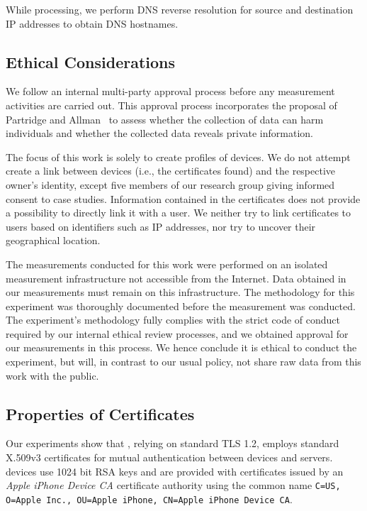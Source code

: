 {\noindent}While processing, we perform DNS reverse resolution for source and destination IP addresses to obtain DNS hostnames.

\subsection{Ethical Considerations}\label{sec:ethical}

We follow an internal multi-party approval process before any measurement
activities are carried out. This approval process incorporates the proposal of
Partridge and Allman~\cite{partridge2016ethical} to assess whether the
collection of data can harm individuals and whether the collected data
reveals private information.

The focus of this work is solely to create profiles of devices. We do not
attempt create a link between devices (i.e., the certificates found) and the
respective owner's identity, except five members of our research group giving informed consent to case studies.
Information contained in the certificates does not provide a possibility to directly link it with a user. 
We neither try to link certificates to users based on identifiers such as IP addresses, nor try to uncover their geographical location.

The measurements conducted for this work were performed on an isolated measurement infrastructure not accessible from the Internet. 
Data obtained in our measurements must remain on this infrastructure. 
%
The methodology for this experiment was thoroughly documented before the measurement was conducted.
The experiment's methodology fully complies with the strict code of conduct required by our internal ethical review processes, and we obtained approval for our measurements in this process. 
We hence conclude it is ethical to conduct the experiment, but will, in contrast to our usual policy, not share raw data from this work with the public.


\subsection{Properties of {\apns} Certificates}
Our experiments show that \apns, relying on standard TLS 1.2, employs
standard X.509v3 certificates for mutual authentication between devices and
{\apns} servers. {\apns} devices use 1024 bit RSA keys and are provided with
certificates issued by an \textit{Apple iPhone Device CA} certificate authority
using the common name \texttt{\footnotesize{C=US, O=Apple Inc., OU=Apple iPhone,
CN=Apple iPhone Device CA}}.



